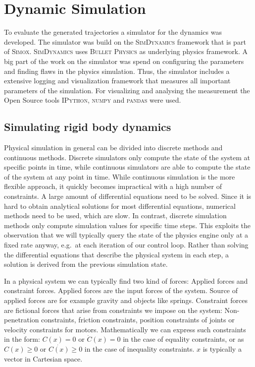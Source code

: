 \documentclass[english,ngerman]{KITreprt}
\newcommand{\name}[1]{\textsc{#1}}
\begin{document}
\chapter{Dynamic Simulation}\label{dynamic-simulation}

To evaluate the generated trajectories a simulator for the dynamics was
developed. The simulator was build on the \name{SimDynamics} framework
that is part of \name{Simox}. \name{SimDynamics} uses
\name{Bullet Physics} as underlying physics framework. A big part of the
work on the simulator was spend on configuring the parameters and
finding flaws in the physics simulation. Thus, the simulator includes a
extensive logging and visualization framework that measures all
important parameters of the simulation. For visualizing and analysing
the measurement the Open Source tools \name{IPython}, \name{numpy} and
\name{pandas} were used.

\section{Simulating rigid body
dynamics}\label{section:rigid-body-simulation}

Physical simulation in general can be divided into discrete methods and
continuous methods. Discrete simulators only compute the state of the
system at specific points in time, while continuous simulators are able
to compute the state of the system at any point in time. While
continuous simulation is the more flexible approach, it quickly becomes
impractical with a high number of constraints. A large amount of
differential equations need to be solved. Since it is hard to obtain
analytical solutions for most differential equations, numerical methods
need to be used, which are slow. In contrast, discrete simulation
methods only compute simulation values for specific time steps. This
exploits the observation that we will typically query the state of the
physics engine only at a fixed rate anyway, e.g.~at each iteration of
our control loop. Rather than solving the differential equations that
describe the physical system in each step, a solution is derived from
the previous simulation state.

In a physical system we can typically find two kind of forces: Applied
forces and constraint forces. Applied forces are the input forces of the
system. Source of applied forces are for example gravity and objects
like springs. Constraint forces are fictional forces that arise from
constraints we impose on the system: Non-penetration constraints,
friction constraints, position constraints of joints or velocity
constraints for motors. Mathematically we can express such constraints
in the form: $C(x) = 0$ or $\dot{C}(x) = 0$ in the case of equality
constraints, or as $C(x) \geq 0$ or $\dot{C(x)} \geq 0$ in the case of
inequality constraints. $x$ is typically a vector in Cartesian space.
\end{document}
